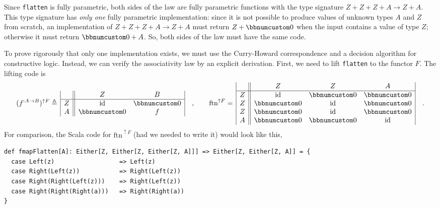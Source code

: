 Since \lstinline!flatten! is fully parametric, both sides of the
law are fully parametric functions with the type signature $Z+Z+Z+A\rightarrow Z+A$.
This type signature has \emph{only one} fully parametric implementation:
since it is not possible to produce values of unknown types $A$ and
$Z$ from scratch, an implementation of $Z+Z+Z+A\rightarrow Z+A$
must return $Z+\bbnum 0$ when the input contains a value of type
$Z$; otherwise it must return $\bbnum 0+A$. So, both sides of the
law must have the same code.

To prove rigorously that only one implementation exists, we must use
the Curry-Howard correspondence and a decision algorithm for constructive
logic. Instead, we can verify the associativity law by an explicit
derivation. First, we need to lift \lstinline!flatten! to the functor
$F$. The lifting code is
\[
(f^{:A\rightarrow B})^{\uparrow F}\triangleq\,\begin{array}{|c||cc|}
 & Z & B\\
\hline Z & \text{id} & \bbnum 0\\
A & \bbnum 0 & f
\end{array}\quad,\quad\quad\text{ftn}^{\uparrow F}=\,\begin{array}{|c||ccc|}
 & Z & Z & A\\
\hline Z & \text{id} & \bbnum 0 & \bbnum 0\\
Z & \bbnum 0 & \text{id} & \bbnum 0\\
Z & \bbnum 0 & \text{id} & \bbnum 0\\
A & \bbnum 0 & \bbnum 0 & \text{id}
\end{array}\quad.
\]
For comparison, the Scala code for $\text{ftn}^{\uparrow F}$ (had
we needed to write it) would look like this,
\begin{lstlisting}
def fmapFlatten[A]: Either[Z, Either[Z, Either[Z, A]]] => Either[Z, Either[Z, A]] = {
  case Left(z)                  => Left(z)
  case Right(Left(z))           => Right(Left(z))
  case Right(Right(Left(z)))    => Right(Left(z))
  case Right(Right(Right(a)))   => Right(Right(a))
}
\end{lstlisting}

